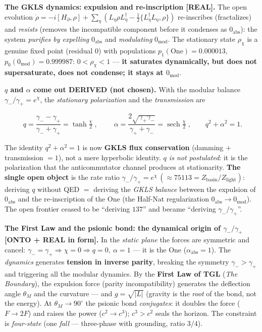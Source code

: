 \documentclass[11pt]{article}
\theoremstyle{definition}\newtheorem{deriv}{Derivation}
\begin{document}
\textbf{The GKLS dynamics: expulsion and re-inscription \textsf{[REAL]}.} The open evolution $\dot\rho=-i[H_\partial,\rho]+\sum_\eta(L_\eta\rho L_\eta^\dagger-\tfrac12\{L_\eta^\dagger L_\eta,\rho\})$ re-inscribes (fractalizes) and \emph{resists} (removes the incompatible component before it condenses as $0_{\mathrm{abs}}$): the system \emph{purifies by expelling} $0_{\mathrm{abs}}$ and \emph{modulating} $0_{\mathrm{mod}}$. The stationary state $\rho_\chi$ is a genuine fixed point (residual $0$) with populations $p_1(\mathrm{One})=0.000013$, $p_0(0_{\mathrm{mod}})=0.999987$: $0<\rho_\chi<1$ --- \textbf{it saturates dynamically, but does not supersaturate, does not condense; it stays at $0_{\mathrm{mod}}$}.

\textbf{$q$ and $\alpha$ come out DERIVED (not chosen).} With the modular balance $\gamma_-/\gamma_+=e^\chi$, the \emph{stationary polarization} and the \emph{transmission} are

\begin{equation}\boxed{\;q=\frac{\gamma_--\gamma_+}{\gamma_-+\gamma_+}=\tanh\tfrac\chi2\;},\qquad \boxed{\;\alpha=\frac{2\sqrt{\gamma_+\gamma_-}}{\gamma_++\gamma_-}=\operatorname{sech}\tfrac\chi2\;},\qquad q^2+\alpha^2=1.\end{equation}

The identity $q^2+\alpha^2=1$ is now \textbf{GKLS flux conservation} (damming $+$ transmission $=1$), not a mere hyperbolic identity. \emph{$q$ is not postulated}: it is the polarization that the anticommutator channel produces at stationarity. \textbf{The single open object} is the rate ratio $\gamma_-/\gamma_+=e^\chi\,(\approx75113=Z_{\mathrm{basin}}/Z_{\mathrm{light}})$: deriving $q$ without QED $=$ deriving the \emph{GKLS balance} between the expulsion of $0_{\mathrm{abs}}$ and the re-inscription of the One (the Half-Nat regularization $0_{\mathrm{abs}}\to0_{\mathrm{mod}}$). The open frontier ceased to be ``deriving $137$'' and became ``deriving $\gamma_-/\gamma_+$''.

\textbf{The First Law and the psionic bond: the dynamical origin of $\gamma_-/\gamma_+$ \textsf{[ONTO + REAL in form]}.} In the \emph{static plane} the forces are symmetric and cancel: $\gamma_-=\gamma_+\Rightarrow\chi=0\Rightarrow q=0,\ \alpha=1$ --- it is the One ($\alpha_{\mathrm{abs}}=1$). The \emph{dynamics} generates \textbf{tension in inverse parity}, breaking the symmetry $\gamma_->\gamma_+$ and triggering all the modular dynamics. By the \textbf{First Law of TGL} (\emph{The Boundary}), the expulsion force (parity incompatibility) generates the deflection angle $\theta_M$ and the curvature --- and $g=\sqrt{|L|}$ (gravity is the \emph{root} of the bond, not the energy). At $\theta_M\to90^\circ$ the psionic bond \emph{conjugates}: it doubles the force ($F\to2F$) and raises the power ($c^2\to c^3$); $c^3>c^2$ seals the horizon. The constraint is \emph{four-state} (one \emph{fall} --- three-phase with grounding, ratio $3/4$).
\end{document}
